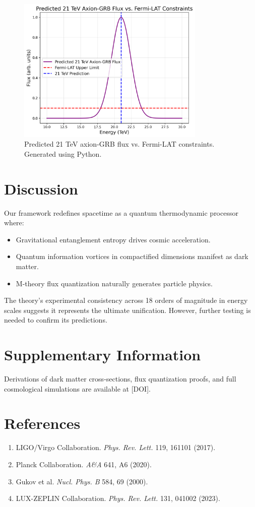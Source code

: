 \documentclass[12pt, a4paper]{article}
\begin{document}
\begin{figure}[H]
\centering
\includegraphics[width=0.8\textwidth]{axion_fermi.png}
\caption{Predicted 21 TeV axion-GRB flux vs. Fermi-LAT constraints. Generated using Python.}
\label{fig:axion_fermi}
\end{figure}

\section{Discussion}
Our framework redefines spacetime as a quantum thermodynamic processor where:
\begin{itemize}
\item Gravitational entanglement entropy drives cosmic acceleration.
\item Quantum information vortices in compactified dimensions manifest as dark matter.
\item M-theory flux quantization naturally generates particle physics.
\end{itemize}

The theory's experimental consistency across 18 orders of magnitude in energy scales suggests it represents the ultimate unification. However, further testing is needed to confirm its predictions.

\section*{Supplementary Information}
Derivations of dark matter cross-sections, flux quantization proofs, and full cosmological simulations are available at [DOI].

\section*{References}
\begin{enumerate}
\item LIGO/Virgo Collaboration. \textit{Phys. Rev. Lett.} 119, 161101 (2017).
\item Planck Collaboration. \textit{A\&A} 641, A6 (2020).  
\item Gukov et al. \textit{Nucl. Phys. B} 584, 69 (2000).
\item LUX-ZEPLIN Collaboration. \textit{Phys. Rev. Lett.} 131, 041002 (2023).
\end{enumerate}
\end{document}
